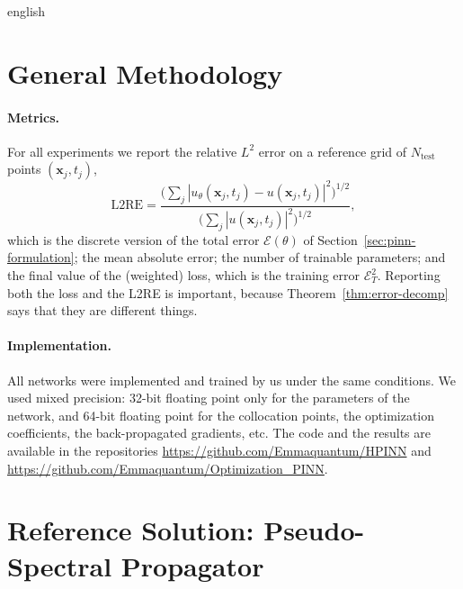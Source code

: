 \documentclass[11pt,letterpaper,twoside,openright]{book} %
\newcommand{\abs}[1]{\left\lvert #1 \right\rvert}
\newif\ifreviewmode
\newcommand{\revtag}[2]{\ifreviewmode{\color{red!70!black}\textsf{\footnotesize[#1#2]}}\fi}
\newcommand{\verificar}[1]{\revtag{VERIFICAR}{: #1}}
\begin{document}
\begin{hyphenrules}{english}
\section{General Methodology}\label{sec:exp-methodology}

\paragraph{Metrics.}
For all experiments we report the relative $L^2$ error on a reference grid of
$N_{\mathrm{test}}$ points $(\mathbf{x}_j,t_j)$,
\begin{equation}
  \mathrm{L2RE}=\frac{\big(\sum_j\abs{u_\theta(\mathbf{x}_j,t_j)-u(\mathbf{x}_j,t_j)}^2\big)^{1/2}}{\big(\sum_j\abs{u(\mathbf{x}_j,t_j)}^2\big)^{1/2}},
  \label{eq:l2re}
\end{equation}
which is the discrete version of the total error $\mathcal{E}(\theta)$ of Section~\ref{sec:pinn-formulation};
the mean absolute error; the number of trainable parameters; and the final value of the (weighted)
loss, which is the training error $\mathcal{E}_T^2$. Reporting both the loss and the L2RE is important,
because Theorem~\ref{thm:error-decomp} says that they are different things.

\paragraph{Implementation.}
All networks were implemented and trained by us under the same conditions. We used mixed precision:
32-bit floating point only for the parameters of the network, and 64-bit floating point for the
collocation points, the optimization coefficients, the back-propagated gradients, etc. The code and the
results are available in the repositories
\url{https://github.com/Emmaquantum/HPINN} and \url{https://github.com/Emmaquantum/Optimization_PINN}.
\verificar{framework (PyTorch/JAX), hardware (GPU), training time and number of random seeds per
configuration}

\section{Reference Solution: Pseudo-Spectral Propagator}\label{sec:reference-solution}


\end{hyphenrules}
\end{document}
